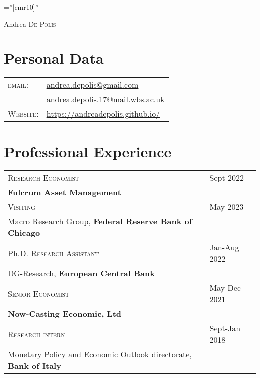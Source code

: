 \documentclass[a4paper,12pt]{article}
\begin{document}
\font\fb=''[cmr10]''

\par{\centering
		{\Huge Andrea \textsc{De Polis}
	}\par}

\section{Personal Data}
\renewcommand{\arraystretch}{0.75}
\begin{tabular}{ll}
        \textsc{email:}     & \href{mailto:andrea.depolis@gmail.com}{andrea.depolis@gmail.com}\\
                        & \href{mailto:andrea.depolis.17@mail.wbs.ac.uk}{andrea.depolis.17@mail.wbs.ac.uk} \\
    \textsc{Website:}   & \url{https://andreadepolis.github.io/}            
                        
\end{tabular}

\section{Professional Experience}
\begin{tabular*}{\linewidth}{@{}l@{\extracolsep{\fill}}l}
\textsc{Research Economist} & Sept 2022-\\
\textbf{Fulcrum Asset Management}\\[1em]
\textsc{Visiting} & May 2023 \\
Macro Research Group, \textbf{Federal Reserve Bank of Chicago}\\[1em]
Ph.D. \textsc{Research Assistant} & Jan-Aug 2022\\
DG-Research, \textbf{European Central Bank}\\[1em]
\textsc{Senior Economist} & May-Dec 2021\\
\textbf{Now-Casting Economic, Ltd}\\[1em]
\textsc{Research intern} & Sept-Jan 2018\\
Monetary Policy and Economic Outlook directorate, \textbf{Bank of Italy}
\end{tabular*}
\end{document}
